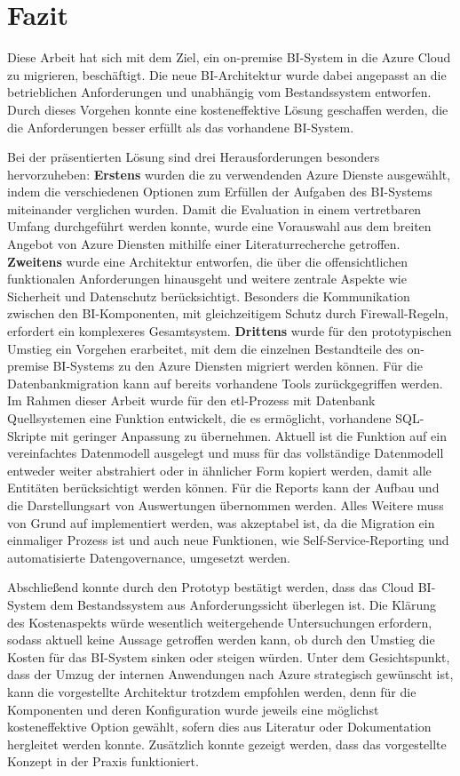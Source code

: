 \chapter{Fazit} \label{ch:zusammenfassung}
Diese Arbeit hat sich mit dem Ziel, ein on-premise BI-System in die Azure Cloud zu migrieren, beschäftigt. Die neue BI-Architektur wurde dabei angepasst an die betrieblichen Anforderungen und unabhängig vom Bestandssystem entworfen. Durch dieses Vorgehen konnte eine kosteneffektive Lösung geschaffen werden, die die Anforderungen besser erfüllt als das vorhandene BI-System.

Bei der präsentierten Lösung sind drei Herausforderungen besonders hervorzuheben: \textbf{Erstens} wurden die zu verwendenden Azure Dienste ausgewählt, indem die verschiedenen Optionen zum Erfüllen der Aufgaben des BI-Systems miteinander verglichen wurden. Damit die Evaluation in einem vertretbaren Umfang durchgeführt werden konnte, wurde eine Vorauswahl aus dem breiten Angebot von Azure Diensten mithilfe einer Literaturrecherche getroffen. \textbf{Zweitens} wurde eine Architektur entworfen, die über die offensichtlichen funktionalen Anforderungen hinausgeht und weitere zentrale Aspekte wie Sicherheit und Datenschutz berücksichtigt. Besonders die Kommunikation zwischen den BI-Komponenten, mit gleichzeitigem Schutz durch Firewall-Regeln, erfordert ein komplexeres Gesamtsystem. \textbf{Drittens} wurde für den prototypischen Umstieg ein Vorgehen erarbeitet, mit dem die einzelnen Bestandteile des on-premise BI-Systems zu den Azure Diensten migriert werden können. Für die Datenbankmigration kann auf bereits vorhandene Tools zurückgegriffen werden. Im Rahmen dieser Arbeit wurde für den \ac{etl}-Prozess mit Datenbank Quellsystemen eine Funktion entwickelt, die es ermöglicht, vorhandene SQL-Skripte mit geringer Anpassung zu übernehmen. Aktuell ist die Funktion auf ein vereinfachtes Datenmodell ausgelegt und muss für das vollständige Datenmodell entweder weiter abstrahiert oder in ähnlicher Form kopiert werden, damit alle Entitäten berücksichtigt werden können. Für die Reports kann der Aufbau und die Darstellungsart von Auswertungen übernommen werden. Alles Weitere muss von Grund auf implementiert werden, was akzeptabel ist, da die Migration ein einmaliger Prozess ist und auch neue Funktionen, wie Self-Service-Reporting und automatisierte Datengovernance, umgesetzt werden.

Abschließend konnte durch den Prototyp bestätigt werden, dass das Cloud BI-System dem Bestandssystem aus Anforderungssicht überlegen ist. Die Klärung des Kostenaspekts würde wesentlich weitergehende Untersuchungen erfordern, sodass aktuell keine Aussage getroffen werden kann, ob durch den Umstieg die Kosten für das BI-System sinken oder steigen würden. Unter dem Gesichtspunkt, dass der Umzug der internen Anwendungen nach Azure strategisch gewünscht ist, kann die vorgestellte Architektur trotzdem empfohlen werden, denn für die Komponenten und deren Konfiguration wurde jeweils eine möglichst kosteneffektive Option gewählt, sofern dies aus Literatur oder Dokumentation hergleitet werden konnte. Zusätzlich konnte gezeigt werden, dass das vorgestellte Konzept in der Praxis funktioniert.

